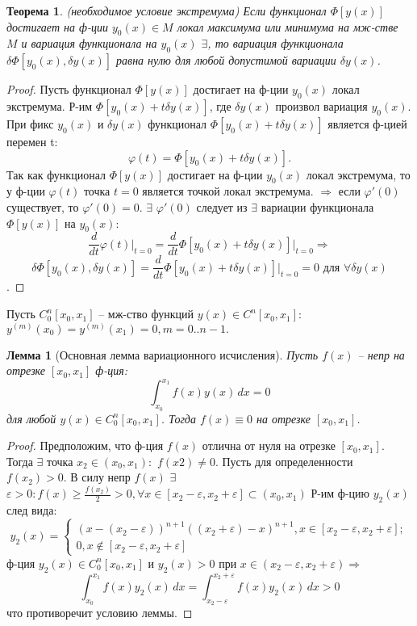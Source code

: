 \documentclass{article}
\newtheorem{theorem}{Теорема}[]
\newtheorem{lemma}{Лемма}
\begin{document}
\begin{theorem}(необходимое условие экстремума)
    Если функционал $\Phi[y(x)]$ достигает на ф-ции
    $y_0(x) \in M$ локал максимума или минимума на мж-стве $M$ и
    вариация функционала на $y_0(x)$ $\exists$, то вариация функционала $\delta\Phi[y_0(x), \delta y(x)]$ равна нулю для любой допустимой вариации $\delta y(x)$.
\end{theorem}
\begin{proof}
    Пусть функционал $\Phi[y(x)]$ достигает на ф-ции
    $y_0(x)$ локал экстремума. Р-им $\Phi[y_0(x) + t\delta y(x)]$, где $\delta y(x)$
    произвол вариация $y_0(x)$. При фикс $y_0(x)$ и $\delta y(x)$ функционал 
    $\Phi[y_0(x) + t\delta y(x)]$ является ф-цией перемен t:
    $$\varphi(t) = \Phi[y_0(x) + t\delta y(x)].$$
    Так как функционал $\Phi[y(x)]$ достигает на ф-ции $y_0(x)$ локал
    экстремума, то у ф-ции $\varphi(t)$ точка $t=0$ является точкой локал экстремума. $\Longrightarrow$ если $\varphi'(0)$ существует, то
    $\varphi'(0)=0$. $\exists$ $\varphi'(0)$ следует из $\exists$ вариации функционала $\Phi[y(x)]$ на $y_0(x)$: $$\frac{d}{dt}\varphi(t)\Big|_{t=0}=\frac{d}{dt}\Phi[y_0(x)+t\delta y(x)]\Big|_{t=0} \Longrightarrow$$
    $$\delta \Phi[y_0(x), \delta y(x)]=\frac{d}{dt}\Phi[y_0(x)+t\delta y(x)]\Big|_{t=0}=0 \text{ для } \forall \delta y(x)$$.
\end{proof}
Пусть $C^n_0 [x_0, x_1]$ -- мж-ство функций $y(x) \in C^n[x_0, x_1]:$ $y^{(m)}(x_0)=y^{(m)}(x_1)=0, m=0..n-1.$

\begin{lemma}[Основная лемма вариационного исчисления]
    Пусть $f(x)$ – непр на отрезке $[x_0, x_1]$ ф-ция: 
    $$ \int_{x_0}^{x_1} f(x)y(x) \,dx=0$$
    для любой $y(x) \in C^n_0[x_0, x_1]$. Тогда $f(x) \equiv 0$ на отрезке $[x_0, x_1]$.
\end{lemma}
\begin{proof}
    Предположим, что ф-ция $f(x)$ отлична от нуля на
    отрезке $[x_0, x_1]$. Тогда $\exists$ точка $x_2 \in (x_0, x_1):$ $f(x2)\neq0$. Пусть для определенности $f(x_2)>0$. В силу непр $f(x)$ $\exists$ $\varepsilon > 0: f(x)\geq \frac{f(x_2)}{2}>0, \forall x \in [x_2 - \varepsilon, x_2 + \varepsilon] \subset (x_0, x_1)$
    Р-им ф-цию $y_2(x)$ след вида: 
    $$y_2(x)=\begin{cases} (x-(x_2-\varepsilon))^{n+1}((x_2+\varepsilon)-x)^{n+1}, x\in[x_2-\varepsilon, x_2+\varepsilon]; \\ 0,  x\notin[x_2-\varepsilon, x_2+\varepsilon] \end{cases}$$
    ф-ция $y_2(x) \in C^n_0[x_0, x_1]$ и $ y_2(x) > 0$ при $x\in(x_2 - \varepsilon, x_2 + \varepsilon) \Longrightarrow$
    $$\int_{x_0}^{x_1} f(x)y_2(x) \,dx=\int_{x_2-\varepsilon}^{x_2+\varepsilon} f(x)y_2(x) \,dx>0$$ что противоречит условию леммы.
\end{proof}
\end{document}
